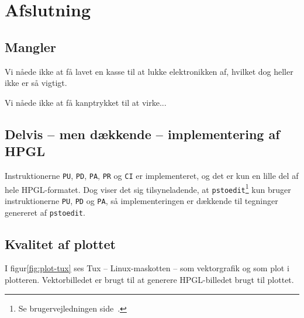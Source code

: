 \chapter{Afslutning}
\label{ch:afslutning}




\section{Mangler}

Vi nåede ikke at få lavet en kasse til at lukke elektronikken af,
hvilket dog heller ikke er så vigtigt.

Vi nåede ikke at få kanptrykket til at virke...

\section{Delvis -- men dækkende -- implementering af HPGL}

Instruktionerne \texttt{PU}, \texttt{PD}, \texttt{PA}, \texttt{PR} og
\texttt{CI} er implementeret, og det er kun en lille del af hele
HPGL-formatet. Dog viser det sig tilsyneladende, at
\texttt{pstoedit}\footnote{Se brugervejledningen
  side~\pageref{ch:brugervejledning}.} kun bruger instruktionerne
\texttt{PU}, \texttt{PD} og \texttt{PA}, så implementeringen er
dækkende til tegninger genereret af \texttt{pstoedit}.


\section{Kvalitet af plottet}

I figur\vref{fig:plot-tux} ses Tux -- Linux-maskotten -- som
vektorgrafik og som plot i plotteren. Vektorbilledet er brugt til at
generere HPGL-billedet brugt til plottet.


